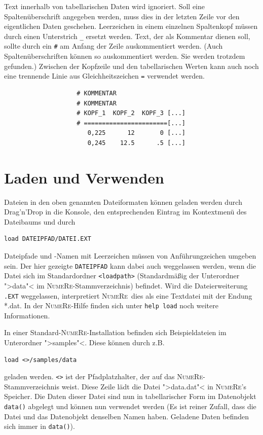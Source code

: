 \documentclass[DIV=14,headsepline,footsepline]{scrbook}
\newcommand{\NR}{\textsc{Nu\-me\-Re}}
\begin{document}
				Text innerhalb von tabellarischen Daten wird ignoriert. Soll eine Spaltenüberschrift angegeben werden, muss dies in der letzten Zeile vor den eigentlichen Daten geschehen. Leerzeichen in einem einzelnen Spaltenkopf müssen durch einen Unterstrich \verb+_+ ersetzt werden. Text, der als Kommentar dienen soll, sollte durch ein \verb+#+ am Anfang der Zeile auskommentiert werden. (Auch Spaltenüberschriften können so auskommentiert werden. Sie werden trotzdem gefunden.) Zwischen der Kopfzeile und den tabellarischen Werten kann auch noch eine trennende Linie aus Gleichheitszeichen \verb+=+ verwendet werden.
				\begin{verbatim}
					# KOMMENTAR
					# KOMMENTAR
					# KOPF_1  KOPF_2  KOPF_3 [...]
					# =======================[...]
					   0,225      12       0 [...]
					   0,245    12.5      .5 [...]
				\end{verbatim}
				
			\section{Laden und Verwenden}
				Dateien in den oben genannten Dateiformaten können geladen werden durch Drag'n'Drop in die Konsole, den entsprechenden Eintrag im Kontextmenü des Dateibaums und durch
				\begin{lstlisting}
load DATEIPFAD/DATEI.EXT
				\end{lstlisting}
				Dateipfade und -Namen mit Leerzeichen müssen von Anführungzeichen umgeben sein. Der hier gezeigte \verb+DATEIPFAD+ kann dabei auch weggelassen werden, wenn die Datei sich im Standardordner \verb+<loadpath>+ (Standardmäßig der Unterordner ">data"< im \NR-Stammverzeichnis) befindet. Wird die Dateierweiterung \verb+.EXT+ weggelassen, interpretiert \NR\ dies als eine Textdatei mit der Endung *.dat. In der \NR-Hilfe finden sich unter \verb+help load+ noch weitere Informationen.
				
				In einer Standard-\NR-Installation befinden sich Beispieldateien im Unterordner ">samples"<. Diese können durch z.B.
				\begin{lstlisting}
load <>/samples/data
				\end{lstlisting}
				geladen werden. \verb+<>+ ist der Pfadplatzhalter, der auf das \NR-Stammverzeichnis weist. Diese Zeile lädt die Datei ">data.dat"< in \NR's Speicher. Die Daten dieser Datei sind nun in tabellarischer Form im Datenobjekt \verb+data()+ abgelegt und können nun verwendet werden (Es ist reiner Zufall, dass die Datei und das Datenobjekt denselben Namen haben. Geladene Daten befinden sich immer in \verb+data()+).
				
\end{document}
